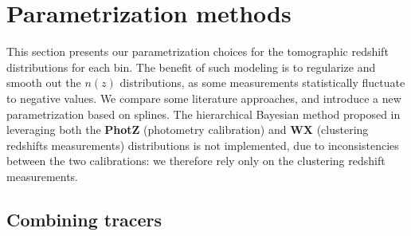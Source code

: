 \section{Parametrization methods}
\label{sec:parametrization}

This section presents our parametrization choices for the tomographic redshift distributions for each bin. The benefit of such modeling is to regularize and smooth out the $n(z)$ distributions, as some measurements statistically fluctuate to negative values. We compare some literature approaches, and introduce a new parametrization based on splines. The hierarchical Bayesian method proposed in \cite{Rau2022compositelikelihood, HSCClusteringRau2023} leveraging both the \textbf{PhotZ} (photometry calibration) and \textbf{WX} (clustering redshifts measurements) distributions is not implemented, due to inconsistencies between the two calibrations: we therefore rely only on the clustering redshift measurements. 

\subsection{Combining tracers}
\label{sec:results:combine_tracers}

